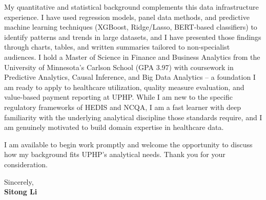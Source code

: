 \documentclass[12pt]{article}
\begin{document}
My quantitative and statistical background complements this data infrastructure experience. I have used regression models, panel data methods, and predictive machine learning techniques (XGBoost, Ridge/Lasso, BERT-based classifiers) to identify patterns and trends in large datasets, and I have presented those findings through charts, tables, and written summaries tailored to non-specialist audiences. I hold a Master of Science in Finance and Business Analytics from the University of Minnesota's Carlson School (GPA 3.97) with coursework in Predictive Analytics, Causal Inference, and Big Data Analytics -- a foundation I am ready to apply to healthcare utilization, quality measure evaluation, and value-based payment reporting at UPHP. While I am new to the specific regulatory frameworks of HEDIS and NCQA, I am a fast learner with deep familiarity with the underlying analytical discipline those standards require, and I am genuinely motivated to build domain expertise in healthcare data.

I am available to begin work promptly and welcome the opportunity to discuss how my background fits UPHP's analytical needs. Thank you for your consideration.

\vspace{1em}

\noindent Sincerely,\\[0.5em]
\textbf{Sitong Li}
\end{document}
